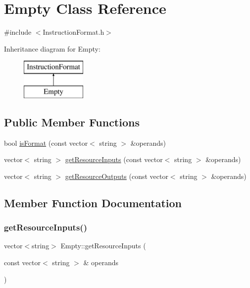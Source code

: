 \hypertarget{classEmpty}{}\section{Empty Class Reference}
\label{classEmpty}


{\ttfamily \#include $<$Instruction\+Format.\+h$>$}

Inheritance diagram for Empty\+:\begin{figure}[H]
\begin{center}
\leavevmode
\includegraphics[height=2.000000cm]{classEmpty}
\end{center}
\end{figure}
\subsection*{Public Member Functions}
\begin{DoxyCompactItemize}
\item 
bool \hyperlink{classEmpty_a2fce1c7e9e73a489c8a79a4046ae45b0}{is\+Format} (const vector$<$ string $>$ \&operands)
\item 
vector$<$ string $>$ \hyperlink{classEmpty_a8710df419a0fe47e9a66d504a6cb016f}{get\+Resource\+Inputs} (const vector$<$ string $>$ \&operands)
\item 
vector$<$ string $>$ \hyperlink{classEmpty_a2952fa936d380f530b232bce35d337be}{get\+Resource\+Outputs} (const vector$<$ string $>$ \&operands)
\end{DoxyCompactItemize}


\subsection{Member Function Documentation}
\mbox{\label{classEmpty_a8710df419a0fe47e9a66d504a6cb016f}} 
\subsubsection{\texorpdfstring{get\+Resource\+Inputs()}{getResourceInputs()}}
{\footnotesize\ttfamily vector$<$string$>$ Empty\+::get\+Resource\+Inputs (\begin{DoxyParamCaption}\item[{const vector$<$ string $>$ \&}]{operands }\end{DoxyParamCaption})\hspace{0.3cm}{\ttfamily [virtual]}}

